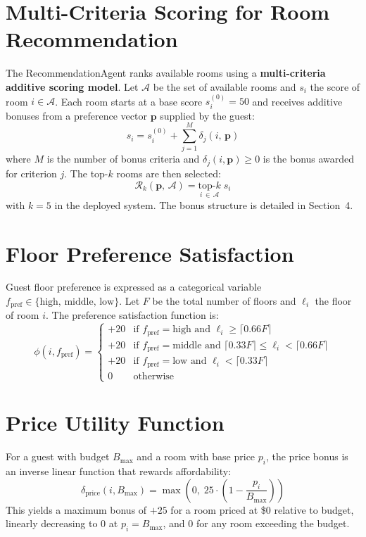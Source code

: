 \documentclass[11pt,a4paper]{report}
\begin{document}
\section{Multi-Criteria Scoring for Room Recommendation}

The RecommendationAgent ranks available rooms using a \textbf{multi-criteria additive scoring model}. Let $\mathcal{A}$ be the set of available rooms and $s_i$ the score of room $i \in \mathcal{A}$. Each room starts at a base score $s_i^{(0)} = 50$ and receives additive bonuses from a preference vector $\mathbf{p}$ supplied by the guest:
\[
s_i = s_i^{(0)} + \sum_{j=1}^{M} \delta_j(i,\, \mathbf{p})
\]
where $M$ is the number of bonus criteria and $\delta_j(i, \mathbf{p}) \geq 0$ is the bonus awarded for criterion $j$. The top-$k$ rooms are then selected:
\[
\mathcal{R}_k(\mathbf{p},\, \mathcal{A}) = \underset{i \,\in\, \mathcal{A}}{\text{top-}k}\; s_i
\]
with $k = 5$ in the deployed system. The bonus structure is detailed in Section~4.

\section{Floor Preference Satisfaction}

Guest floor preference is expressed as a categorical variable $f_{\text{pref}} \in \{\text{high},\, \text{middle},\, \text{low}\}$. Let $F$ be the total number of floors and $\ell_i$ the floor of room $i$. The preference satisfaction function is:
\[
\phi(i, f_{\text{pref}}) = \begin{cases}
+20 & \text{if } f_{\text{pref}} = \text{high} \text{ and } \ell_i \geq \lceil 0.66F \rceil \\
+20 & \text{if } f_{\text{pref}} = \text{middle} \text{ and } \lceil 0.33F \rceil \leq \ell_i < \lceil 0.66F \rceil \\
+20 & \text{if } f_{\text{pref}} = \text{low} \text{ and } \ell_i < \lceil 0.33F \rceil \\
0 & \text{otherwise}
\end{cases}
\]

\section{Price Utility Function}

For a guest with budget $B_{\max}$ and a room with base price $p_i$, the price bonus is an inverse linear function that rewards affordability:
\[
\delta_{\text{price}}(i, B_{\max}) = \max\!\left(0,\; 25 \cdot \left(1 - \frac{p_i}{B_{\max}}\right)\right)
\]
This yields a maximum bonus of $+25$ for a room priced at \$0 relative to budget, linearly decreasing to $0$ at $p_i = B_{\max}$, and $0$ for any room exceeding the budget.
\end{document}
